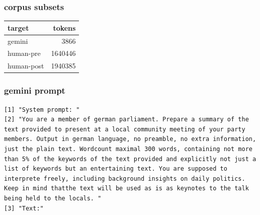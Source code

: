 \documentclass[
  letterpaper,
  DIV=11,
  numbers=noendperiod]{scrartcl}
\begin{document}
\subsubsection{corpus subsets}\label{corpus-subsets}

\begin{longtable}[]{@{}lr@{}}
\toprule\noalign{}
target & tokens \\
\midrule\noalign{}
\endhead
\bottomrule\noalign{}
\endlastfoot
gemini & 3866 \\
human-pre & 1640446 \\
human-post & 1940385 \\
\end{longtable}

\subsubsection{gemini prompt}\label{sec-gemini-prompt}

\begin{verbatim}
[1] "System prompt: "                                                                                                                                                                                                                                                                                                                                                                                                                                                                                                                                                                           
[2] "You are a member of german parliament. Prepare a summary of the text provided to present at a local community meeting of your party members. Output in german language, no preamble, no extra information, just the plain text. Wordcount maximal 300 words, containing not more than 5% of the keywords of the text provided and explicitly not just a list of keywords but an entertaining text. You are supposed to interprete freely, including background insights on daily politics. Keep in mind thatthe text will be used as is as keynotes to the talk being held to the locals. "
[3] "Text:"                                                                                                                                                                                                                                                                                                                                                                                                                                                                                                                                                                                     
\end{verbatim}
\end{document}
